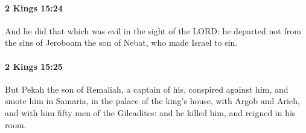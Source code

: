 		\paragraph{2 Kings 15:24} %
			\label{2KINGS-15-24}

			And he did that which was evil in the sight of the LORD: he departed not from the sins of Jeroboam the son of Nebat, who made Israel to sin.


		\paragraph{2 Kings 15:25} %
			\label{2KINGS-15-25}

			But Pekah the son of Remaliah, a captain of his, conspired against him, and smote him in Samaria, in the palace of the king’s house, with Argob and Arieh, and with him fifty men of the Gileadites: and he killed him, and reigned in his room.


